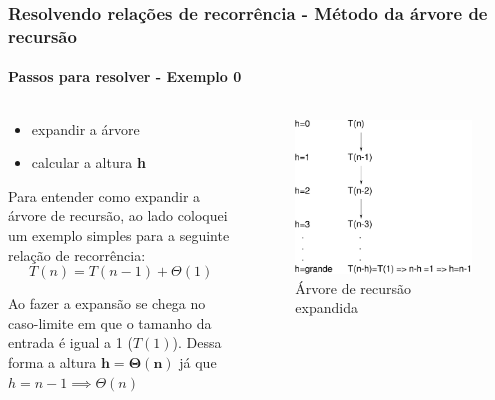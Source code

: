 \begin{frame}
	\frametitle{Resolvendo relações de recorrência - Método da árvore de recursão}
	\framesubtitle{Passos para resolver - Exemplo 0}
		\begin{columns}
		\begin{column}{0.5\textwidth}
			\begin{itemize}
				\item expandir a árvore
				\item calcular a altura \textbf{h}
			\end{itemize}
		
			\par Para entender como expandir a árvore de recursão, ao lado coloquei um exemplo simples para a seguinte relação de recorrência:
			\begin{equation}
				T(n)=T(n-1) + \Theta(1)
			\end{equation}
			\par Ao fazer a expansão se chega no caso-limite em que o tamanho da entrada é igual a 1 ($T(1)$). Dessa forma a altura $\mathbf{h=\Theta(n)}$ já que $h=n-1 \implies \Theta(n)$
		\end{column}
		\begin{column}{0.5\textwidth}
			\begin{figure}
				\centering
				\includegraphics[width=.9\linewidth]{images/arvoreDeRecussao00}
				\caption{Árvore de recursão expandida}
				\label{fig:arvorederecussao00}
			\end{figure}
		\end{column}
	\end{columns}
\end{frame}

